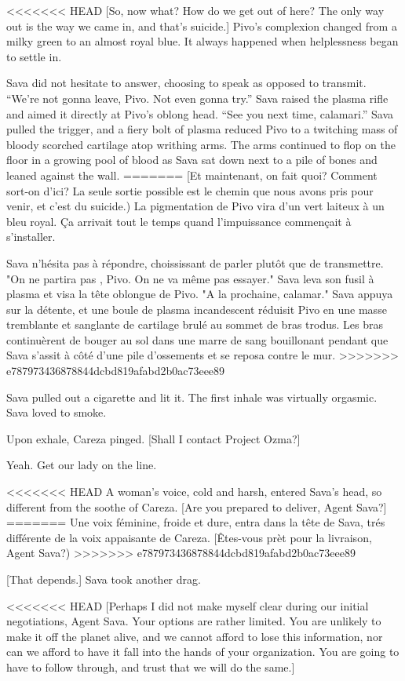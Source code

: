 <<<<<<< HEAD
[So, now what? How do we get out of here? The only way out is the way we came in, and that's suicide.] Pivo's complexion changed from a milky green to an almost royal blue. It always happened when helplessness began to settle in. 

Sava did not hesitate to answer, choosing to speak as opposed to transmit. ``We're not gonna leave, Pivo. Not even gonna try.'' Sava raised the plasma rifle and aimed it directly at Pivo's oblong head. ``See you next time, calamari.'' Sava pulled the trigger, and a fiery bolt of plasma reduced Pivo to a twitching mass of bloody scorched cartilage atop writhing arms. The arms continued to flop on the floor in a growing pool of blood as Sava sat down next to a pile of bones and leaned against the wall. 
=======
[Et maintenant, on fait quoi? Comment sort-on d'ici? La seule sortie possible est le chemin que nous avons pris pour venir, et c'est du suicide.) La pigmentation de Pivo vira d'un vert laiteux à un bleu royal. Ça arrivait tout le temps quand l'impuissance commençait à s'installer. 

Sava n'hésita pas à répondre, choississant de parler plutôt que de transmettre. "On ne partira pas , Pivo. On ne va même pas essayer." Sava leva son fusil à plasma et visa la tête oblongue de Pivo. "A la prochaine, calamar." Sava appuya sur la détente, et une boule de plasma incandescent réduisit Pivo en une masse tremblante et sanglante de  cartilage brulé au sommet de bras trodus. Les bras continuèrent de bouger au sol dans une marre de sang bouillonant pendant que Sava s'assit à côté d'une pile d'ossements et se reposa contre le mur. 
>>>>>>> e787973436878844dcbd819afabd2b0ac73eee89

Sava pulled out a cigarette and lit it. The first inhale was virtually orgasmic. Sava loved to smoke. 

Upon exhale, Careza pinged. [Shall I contact Project Ozma?] 

Yeah. Get our lady on the line. 

<<<<<<< HEAD
A woman's voice, cold and harsh, entered Sava's head, so different from the soothe of Careza. [Are you prepared to deliver, Agent Sava?] 
=======
Une voix féminine, froide et dure, entra dans la tête de Sava, trés différente de la voix appaisante de Careza. [Êtes-vous prèt pour la livraison, Agent Sava?) 
>>>>>>> e787973436878844dcbd819afabd2b0ac73eee89

[That depends.] Sava took another drag. 

<<<<<<< HEAD
[Perhaps I did not make myself clear during our initial negotiations, Agent Sava. Your options are rather limited. You are unlikely to make it off the planet alive, and we cannot afford to lose this information, nor can we afford to have it fall into the hands of your organization. You are going to have to follow through, and trust that we will do the same.] 

